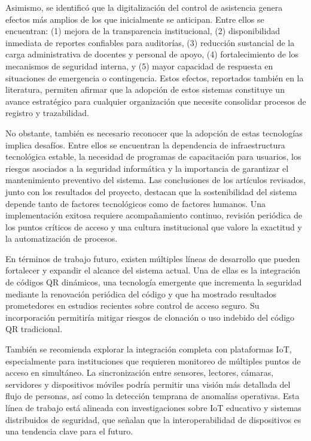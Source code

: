 Asimismo, se identificó que la digitalización del control de asistencia genera efectos más amplios de los que inicialmente se anticipan. Entre ellos se encuentran: (1) mejora de la transparencia institucional, (2) disponibilidad inmediata de reportes confiables para auditorías, (3) reducción sustancial de la carga administrativa de docentes y personal de apoyo, (4) fortalecimiento de los mecanismos de seguridad interna, y (5) mayor capacidad de respuesta en situaciones de emergencia o contingencia. Estos efectos, reportados también en la literatura, permiten afirmar que la adopción de estos sistemas constituye un avance estratégico para cualquier organización que necesite consolidar procesos de registro y trazabilidad.

No obstante, también es necesario reconocer que la adopción de estas tecnologías implica desafíos. Entre ellos se encuentran la dependencia de infraestructura tecnológica estable, la necesidad de programas de capacitación para usuarios, los riesgos asociados a la seguridad informática y la importancia de garantizar el mantenimiento preventivo del sistema. Las conclusiones de los artículos revisados, junto con los resultados del proyecto, destacan que la sostenibilidad del sistema depende tanto de factores tecnológicos como de factores humanos. Una implementación exitosa requiere acompañamiento continuo, revisión periódica de los puntos críticos de acceso y una cultura institucional que valore la exactitud y la automatización de procesos.

En términos de trabajo futuro, existen múltiples líneas de desarrollo que pueden fortalecer y expandir el alcance del sistema actual. Una de ellas es la integración de códigos QR dinámicos, una tecnología emergente que incrementa la seguridad mediante la renovación periódica del código y que ha mostrado resultados prometedores en estudios recientes sobre control de acceso seguro. Su incorporación permitiría mitigar riesgos de clonación o uso indebido del código QR tradicional.

También se recomienda explorar la integración completa con plataformas IoT, especialmente para instituciones que requieren monitoreo de múltiples puntos de acceso en simultáneo. La sincronización entre sensores, lectores, cámaras, servidores y dispositivos móviles podría permitir una visión más detallada del flujo de personas, así como la detección temprana de anomalías operativas. Esta línea de trabajo está alineada con investigaciones sobre IoT educativo y sistemas distribuidos de seguridad, que señalan que la interoperabilidad de dispositivos es una tendencia clave para el futuro.

